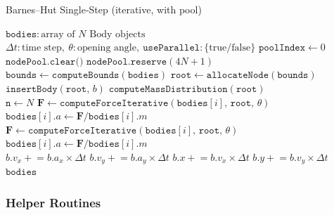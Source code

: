 \documentclass{article}
\begin{document}
\begin{algorithm}[H]
    \caption{Barnes–Hut Single‐Step (iterative, with pool)}\label{alg:bh_detail}
    \begin{algorithmic}[1]
        \Require \(\texttt{bodies}\colon \text{array of }N \text{ Body objects}\)
        \Require \(\Delta t\colon \text{time step},\ \theta\colon \text{opening angle},\ \texttt{useParallel}\colon \{\text{true}/\text{false}\}\)
        \State \(\texttt{poolIndex} \gets 0\)
        \State \(\texttt{nodePool.clear()}\)
        \State \(\texttt{nodePool.reserve}(4N + 1)\) 
        \\
        \State \(\texttt{bounds} \gets \texttt{computeBounds}(\texttt{bodies})\)
        \State \(\texttt{root} \gets \texttt{allocateNode}(\texttt{bounds})\)
            \State \(\texttt{insertBody}(\texttt{root},\,b)\)
        \EndFor
        \State \(\texttt{computeMassDistribution}(\texttt{root})\)
        \\
        \State \(\texttt{n} \gets N\)
                \State \quad \(\mathbf{F} \gets \texttt{computeForceIterative}( \texttt{bodies}[i],\,\texttt{root},\,\theta)\)
                \State \quad \(\texttt{bodies}[i].a \gets \mathbf{F} / \texttt{bodies}[i].m\)
        \Else
                \State \(\mathbf{F} \gets \texttt{computeForceIterative}( \texttt{bodies}[i],\,\texttt{root},\,\theta)\)
                \State \(\texttt{bodies}[i].a \gets \mathbf{F} / \texttt{bodies}[i].m\)
            \EndFor
        \EndIf
        \\
            \State \(b.v_x \mathrel{+}= b.a_x \times \Delta t\)
            \State \(b.v_y \mathrel{+}= b.a_y \times \Delta t\)
            \State \(b.x   \mathrel{+}= b.v_x \times \Delta t\)
            \State \(b.y   \mathrel{+}= b.v_y \times \Delta t\)
        \EndFor
        \\
        \State \Return \(\texttt{bodies}\) 
    \end{algorithmic}
\end{algorithm}

\subsubsection*{Helper Routines}
\end{document}

